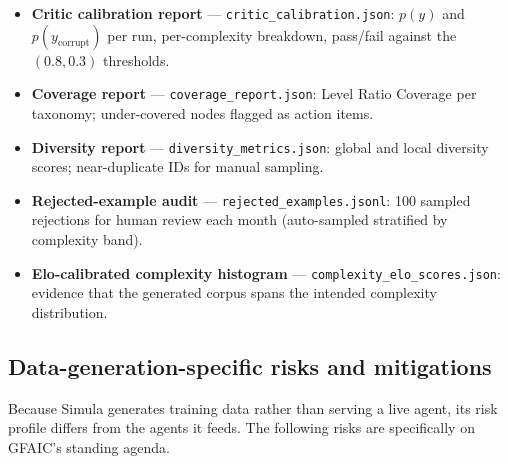 \documentclass[11pt,a4paper]{article}
\begin{document}
\begin{itemize}[nosep]
  \item \textbf{Critic calibration report} --- \texttt{critic\_calibration.json}:
        $p(y)$ and $p(y_{\text{corrupt}})$ per run, per-complexity
        breakdown, pass/fail against the $(0.8, 0.3)$ thresholds.
  \item \textbf{Coverage report} --- \texttt{coverage\_report.json}:
        Level Ratio Coverage per taxonomy; under-covered nodes
        flagged as action items.
  \item \textbf{Diversity report} --- \texttt{diversity\_metrics.json}:
        global and local diversity scores; near-duplicate IDs for
        manual sampling.
  \item \textbf{Rejected-example audit} --- \texttt{rejected\_examples.jsonl}:
        100 sampled rejections for human review each month (auto-sampled
        stratified by complexity band).
  \item \textbf{Elo-calibrated complexity histogram} ---
        \texttt{complexity\_elo\_scores.json}: evidence that the
        generated corpus spans the intended complexity distribution.
\end{itemize}

\subsection{Data-generation-specific risks and mitigations}

Because Simula generates training data rather than serving a live
agent, its risk profile differs from the agents it feeds. The
following risks are specifically on GFAIC's standing agenda.
\end{document}
